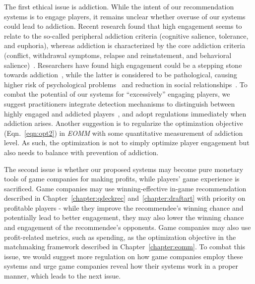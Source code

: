 
The first ethical issue is addiction. While the intent of our recommendation systems is to engage players, it remains unclear whether overuse of our systems could lead to addiction. Recent research found that high engagement seems to relate to the so-called peripheral addiction criteria (cognitive salience, tolerance, and euphoria), whereas addiction is characterized by the core addiction criteria (conflict, withdrawal symptoms, relapse and reinstatement, and behavioral salience)~\citep{charlton2007distinguishing}. Researchers have found high engagement could be a stepping stone towards addiction~\citep{charlton2007distinguishing}, while the latter is considered to be pathological, causing higher risk of psychological problems~\citep{lehenbauer2015addiction,brunborg2013gaming} and reduction in social relationships~\citep{kraut2002internet,blais2008adolescents}. To combat the potential of our systems for ``excessively'' engaging players, we suggest practitioners integrate detection mechanisms to distinguish between highly engaged and addicted players~\citep{charlton2007distinguishing,fisher1994identifying,griffiths1998dependence,brown1997theoretical,griffiths1996behavioural,seok2014distinguishing}, and adopt regulations immediately when addiction arises. Another suggestion is to regularize the optimization objective (Eqn.~\ref{eqn:opt2}) in \textit{EOMM} with some quantitative measurement of addiction level. As such, the optimization is not to simply optimize player engagement but also needs to balance with prevention of addiction.

The second issue is whether our proposed systems may become pure monetary tools of game companies for making profits, while players' game experience is sacrificed. Game companies may use winning-effective in-game recommendation described in Chapter~\ref{chapter:qdeckrec} and~\ref{chapter:draftart} with priority on profitable players - while they improve the recommendee's winning chance and potentially lead to better engagement, they may also lower the winning chance and engagement of the recommendee's opponents. Game companies may also use profit-related metrics, such as spending, as the optimization objective in the matchmaking framework described in Chapter~\ref{chapter:eomm}. To combat this issue, we would suggest more regulation on how game companies employ these systems and urge game companies reveal how their systems work in a proper manner, which leads to the next issue.

